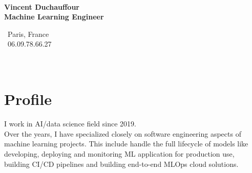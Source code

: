 \documentclass[a4paper,10pt]{article}
\begin{document}
\thispagestyle{empty}


\begin{adjustbox}{valign=t}
    \begin{minipage}{0.32\textwidth}
        \begin{center}
            {\Large \bfseries \\Vincent Duchauffour}\\
            {\large \bfseries Machine Learning Engineer}\\[1cm]
            \raggedright
            \vspace{-.5cm}
            \faHome~Paris, France\\
            \faPhone~06.09.78.66.27\\
            \textcolor{ColorTwo}{\faEnvelopeO}
            \\
            \textcolor{ColorTwo}{\faLinkedin}
            \\
            \textcolor{ColorTwo}{\faGithub}
        \end{center}
        \vspace{-.5cm}
        \section*{Profile}
        \justifying
        I work in AI/data science field since 2019. \\Over the years, I have specialized closely on software engineering aspects of machine learning projects. This include handle the full lifecycle of models like developing, deploying and monitoring ML application for production use, building CI/CD pipelines and building end-to-end MLOps cloud solutions.
        \vspace{-.5cm}

\end{minipage}
\end{adjustbox}
\end{document}
